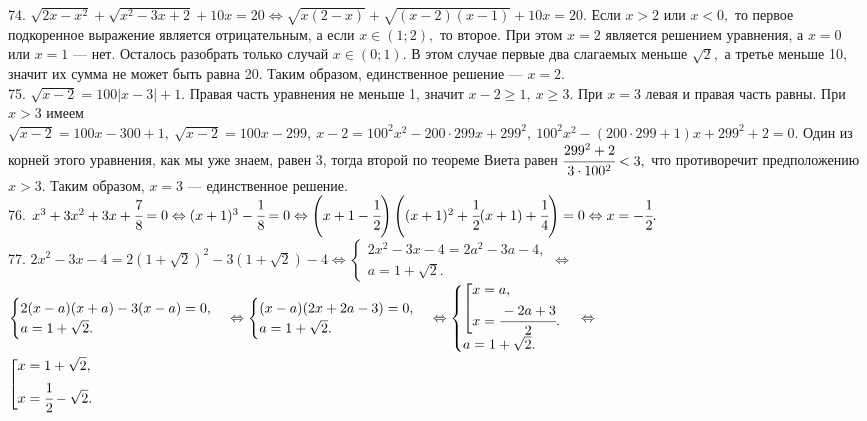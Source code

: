 \documentclass[12pt]{article}
\begin{document}
74. $\sqrt{2x-x^2}+\sqrt{x^2-3x+2}+10x=20\Leftrightarrow \sqrt{x(2-x)}+\sqrt{(x-2)(x-1)}+10x=20.$ Если $x>2$ или $x<0,$ то первое подкоренное выражение является отрицательным, а если $x\in (1;2),$ то второе. При этом $x=2$ является решением уравнения, а  $x=0$ или $x=1$ --- нет. Осталось разобрать только случай $x\in(0;1).$ В этом случае первые два слагаемых меньше $\sqrt{2},$ а третье меньше 10, значит их сумма не может быть равна 20. Таким образом, единственное решение --- $x=2.$\\
75. $\sqrt{x-2}=100|x-3|+1.$ Правая часть уравнения не меньше 1, значит  $x-2\geqslant1,\ x\geqslant3.$ При $x=3$ левая и правая часть равны. При $x>3$ имеем
$\sqrt{x-2}=100x-300+1,\ \sqrt{x-2}=100x-299,\ x-2=100^2x^2-200\cdot299x+299^2,\ 100^2x^2-(200\cdot299+1)x+299^2+2=0.$ Один из корней этого уравнения, как мы уже знаем, равен 3, тогда второй по теореме Виета равен $\cfrac{299^2+2}{3\cdot100^2}<3,$ что противоречит предположению $x>3.$ Таким образом, $x=3$ --- единственное решение.\\
76. $x^3+3x^2+3x+\cfrac{7}{8}=0 \Leftrightarrow (x+1)^3-\cfrac{1}{8}=0\Leftrightarrow \left(x+1-\cfrac{1}{2}\right)\left((x+1)^2+\cfrac{1}{2}(x+1)+\cfrac{1}{4}\right)=0\Leftrightarrow x=-\cfrac{1}{2}.$\\
77. $2x^2-3x-4=2(1+\sqrt{2})^2-3(1+\sqrt{2})-4\Leftrightarrow\begin{cases}2x^2-3x-4=2a^2-3a-4,\\ a=1+\sqrt{2}.\end{cases}
\Leftrightarrow$\\$\begin{cases}2(x-a)(x+a)-3(x-a)=0,\\ a=1+\sqrt{2}.\end{cases}
\Leftrightarrow\begin{cases}(x-a)(2x+2a-3)=0,\\ a=1+\sqrt{2}.\end{cases}
\Leftrightarrow \begin{cases}\left[\begin{gathered}
     x=a,\hfill\\
     x=\cfrac{-2a+3}{2}.\hfill \end{gathered}\right.\\ a=1+\sqrt{2}.\end{cases}\Leftrightarrow$\\$
\left[\begin{gathered}
     x=1+\sqrt{2},\hfill\\
     x=\cfrac{1}{2}-\sqrt{2}.\hfill \end{gathered}\right.$\\
\end{document}
